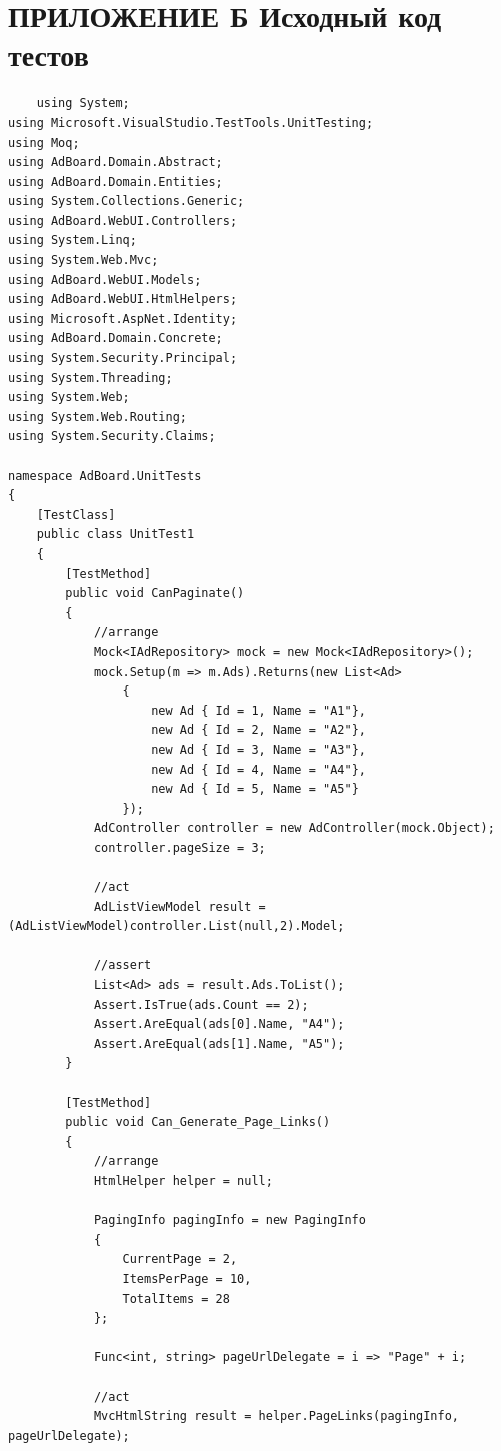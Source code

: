 \documentclass[14pt,a4paper]{extreport}
\begin{document}
	\section*{\center\normalsize ПРИЛОЖЕНИЕ Б Исходный код тестов \endcenter}
	\begin{lstlisting}
	using System;
using Microsoft.VisualStudio.TestTools.UnitTesting;
using Moq;
using AdBoard.Domain.Abstract;
using AdBoard.Domain.Entities;
using System.Collections.Generic;
using AdBoard.WebUI.Controllers;
using System.Linq;
using System.Web.Mvc;
using AdBoard.WebUI.Models;
using AdBoard.WebUI.HtmlHelpers;
using Microsoft.AspNet.Identity;
using AdBoard.Domain.Concrete;
using System.Security.Principal;
using System.Threading;
using System.Web;
using System.Web.Routing;
using System.Security.Claims;

namespace AdBoard.UnitTests
{
    [TestClass]
    public class UnitTest1
    {
        [TestMethod]
        public void CanPaginate()
        {
            //arrange
            Mock<IAdRepository> mock = new Mock<IAdRepository>();
            mock.Setup(m => m.Ads).Returns(new List<Ad>
                {
                    new Ad { Id = 1, Name = "A1"},
                    new Ad { Id = 2, Name = "A2"},
                    new Ad { Id = 3, Name = "A3"},
                    new Ad { Id = 4, Name = "A4"},
                    new Ad { Id = 5, Name = "A5"}
                });
            AdController controller = new AdController(mock.Object);
            controller.pageSize = 3;

            //act
            AdListViewModel result = (AdListViewModel)controller.List(null,2).Model;

            //assert
            List<Ad> ads = result.Ads.ToList();
            Assert.IsTrue(ads.Count == 2);
            Assert.AreEqual(ads[0].Name, "A4");
            Assert.AreEqual(ads[1].Name, "A5");
        }

        [TestMethod]
        public void Can_Generate_Page_Links()
        {
            //arrange
            HtmlHelper helper = null;

            PagingInfo pagingInfo = new PagingInfo
            {
                CurrentPage = 2,
                ItemsPerPage = 10,
                TotalItems = 28
            };

            Func<int, string> pageUrlDelegate = i => "Page" + i;

            //act
            MvcHtmlString result = helper.PageLinks(pagingInfo, pageUrlDelegate);


\end{lstlisting}
\end{document}
